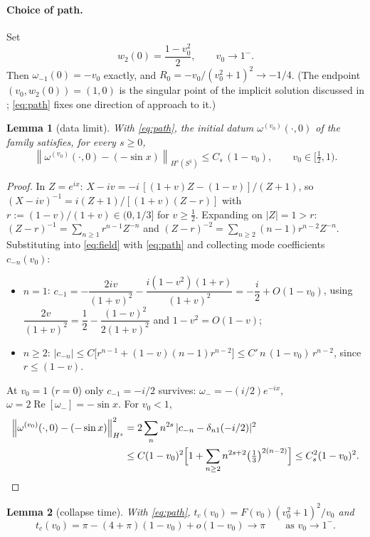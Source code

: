 \documentclass[11pt,a4paper]{article}
\theoremstyle{plain}
\newtheorem{lemma}{Lemma}
\theoremstyle{definition}
\theoremstyle{plain}
\newcommand{\Sone}{S^1}
\newcommand{\norm}[1]{\left\lVert #1 \right\rVert}
\newcommand{\abs}[1]{\lvert #1 \rvert}
\DeclareMathOperator{\Real}{Re}
\begin{document}
\paragraph{Choice of path.} Set
\begin{equation}\label{eq:path}
w_2(0)=\frac{1-v_0^2}{2},\qquad v_0\to1^-.
\end{equation}
Then $\omega_{-1}(0)=-v_0$ exactly, and $R_0=-v_0/(v_0^2+1)^2\to-1/4$. (The endpoint $(v_0,w_2(0))=(1,0)$ is the singular point of the implicit solution discussed in \cite[Remark~2]{SLSA25}; \eqref{eq:path} fixes one direction of approach to it.)

\begin{lemma}[data limit]\label{lem:data}
With \eqref{eq:path}, the initial datum $\omega^{(v_0)}(\cdot,0)$ of the family satisfies, for every $s\ge0$,
\[
\norm{\omega^{(v_0)}(\cdot,0)-(-\sin x)}_{H^s(\Sone)}\le C_s\,(1-v_0),\qquad v_0\in[\tfrac12,1).
\]
\end{lemma}

\begin{proof}
In $Z=e^{ix}$: $X-iv=-i\,[(1+v)Z-(1-v)]/(Z+1)$, so $(X-iv)^{-1}=i(Z+1)/[(1+v)(Z-r)]$ with $r:=(1-v)/(1+v)\in(0,1/3]$ for $v\ge\tfrac12$. Expanding on $\abs{Z}=1>r$: $(Z-r)^{-1}=\sum_{n\ge1}r^{n-1}Z^{-n}$ and $(Z-r)^{-2}=\sum_{n\ge2}(n-1)r^{n-2}Z^{-n}$. Substituting into \eqref{eq:field} with \eqref{eq:path} and collecting mode coefficients $c_{-n}(v_0)$:
\begin{itemize}[leftmargin=2em]
\item $n=1$: $c_{-1}=-\dfrac{2iv}{(1+v)^2}-\dfrac{i(1-v^2)(1+r)}{(1+v)^2}=-\dfrac{i}{2}+O(1-v_0)$, using $\dfrac{2v}{(1+v)^2}=\dfrac12-\dfrac{(1-v)^2}{2(1+v)^2}$ and $1-v^2=O(1-v)$;
\item $n\ge2$: $\abs{c_{-n}}\le C\big[r^{n-1}+(1-v)(n-1)r^{n-2}\big]\le C'\,n\,(1-v_0)\,r^{n-2}$, since $r\le(1-v)$.
\end{itemize}
At $v_0=1$ ($r=0$) only $c_{-1}=-i/2$ survives: $\omega_-=-(i/2)e^{-ix}$, $\omega=2\Real[\omega_-]=-\sin x$. For $v_0<1$,
\begin{align*}
\norm{\omega^{(v_0)}(\cdot,0)-(-\sin x)}_{H^s}^2&=2\sum_n n^{2s}\,\abs{c_{-n}-\delta_{n1}(-i/2)}^2\\
&\le C(1-v_0)^2\Big[1+\sum_{n\ge2}n^{2s+2}\big(\tfrac13\big)^{2(n-2)}\Big]\le C_s^2(1-v_0)^2.\qedhere
\end{align*}
\end{proof}

\begin{lemma}[collapse time]\label{lem:tc}
With \eqref{eq:path}, $t_c(v_0)=F(v_0)(v_0^2+1)^2/v_0$ and
\[
t_c(v_0)=\pi-(4+\pi)(1-v_0)+o(1-v_0)\to\pi\qquad\text{as }v_0\to1^-.
\]
\end{lemma}
\end{document}
